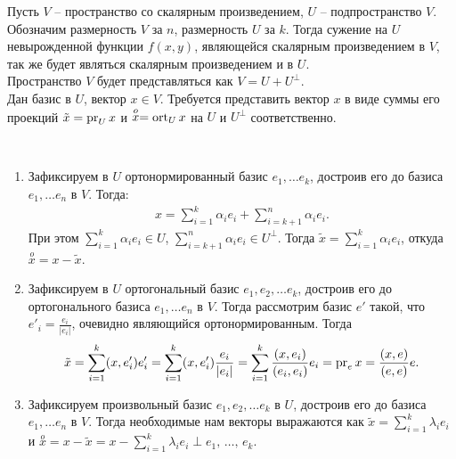 \begin{problem}
    Пусть $V$ -- пространство со скалярным произведением, $U$ -- подпространство $V$. Обозначим 
    размерность $V$ за $n$, размерность $U$ за $k$. Тогда сужение на $U$
    невырожденной функции $f(x, y)$, являющейся скалярным произведением в $V$, так же будет являться
    скалярным произведением и в $U$. \\
    Пространство $V$ будет представляться как $V = U + U^{\perp}$. \\
    Дан базис в $U$, вектор $x \in V$. Требуется представить вектор $x$ в виде суммы его проекций 
    $\tilde{x} = \operatorname{pr}_U x$ и $\stackrel{o}{x} = \operatorname{ort}_U x$ на $U$ и $U^{\perp}$ соответственно.
\end{problem}

\begin{algorithm}~
    \begin{enumerate}
        \item Зафиксируем в $U$ ортонормированный базис $e_1, \dots e_k$, достроив его до базиса 
        $e_1, \dots e_n$ в $V$. Тогда:
        \begin{gather*}
            x = \sum_{i=1}^{k} \alpha_i e_i + \sum_{i=k+1}^{n}\alpha_i e_i.
        \end{gather*}
        При этом $\displaystyle\sum_{i=1}^{k} \alpha_i e_i \in U$, 
        $\displaystyle \sum_{i=k+1}^{n}\alpha_i e_i \in U^{\perp}$. Тогда 
        $\tilde{x} = \displaystyle\sum_{i=1}^{k}\alpha_i e_i$, откуда $\stackrel{o}{x} = x - \tilde{x}$.
        \item Зафиксируем в $U$ ортогональный базис $e_1, e_2, \dots e_k$, достроив его до 
        ортогонального базиса $e_1, \dots e_n$ в $V$. Тогда рассмотрим базис $e'$ такой, что
        $e'_i = \frac{e_i}{|e_i|}$, очевидно являющийся ортонормированным. Тогда 
        \begin{gather*}
            \tilde{x} = \displaystyle\sum_{i=1}^{k} (x, e'_i)e'_i = \displaystyle\sum_{i=1}^{k} (x, e'_i) 
            \frac{e_i}{|e_i|} = \displaystyle\sum_{i=1}^{k} \frac{(x, e_i)}{(e_i, e_i)} e_i = 
            \operatorname{pr}_e x = \frac{(x, e)}{(e, e)} e.
        \end{gather*}
        \item Зафиксируем произвольный базис $e_1, e_2, \dots e_k$ в $U$, достроив его до базиса
        $e_1, \dots e_n$ в $V$.
        Тогда необходимые нам векторы выражаются как $\tilde{x} = \displaystyle\sum_{i=1}^{k} \lambda_i e_i$ и $\stackrel{o}{x} = x - \tilde{x} = 
        x - \displaystyle\sum_{i=1}^{k} \lambda_i e_i \perp e_1, \, \dots , \, e_k$.
        

\end{enumerate}
\end{algorithm}
